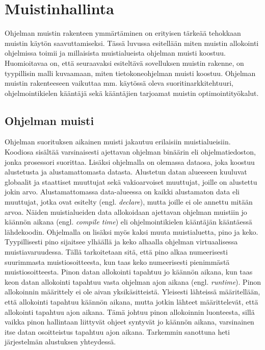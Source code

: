 \chapter{Muistinhallinta} \label{Toinen luku}

Ohjelman muistin rakenteen ymmärtäminen on erityisen tärkeää tehokkaan muistin käytön saavuttamiseksi. Tässä luvussa esitellään miten muistin allokointi ohjelmissa toimii ja millaisista muistialueista ohjelman muisti koostuu. Huomioitavaa on, että seuraavaksi esiteltävä sovelluksen muistin rakenne, on tyypillisin malli kuvaamaan, miten tietokoneohjelman muisti koostuu. Ohjelman muistin rakenteeseen vaikuttaa mm. käytössä oleva suoritinarkkitehtuuri, ohjelmointikielen kääntäjä sekä kääntäjien tarjoamat muistin optimointityökalut.

\section{Ohjelman muisti}

Ohjelman suorituksen aikainen muisti jakautuu erilaisiin muistialueisiin. Koodiosa sisältää varsinaisesti ajettavan ohjelman binäärin eli ohjelmatiedoston, jonka prosessori suorittaa. Lisäksi ohjelmalla on olemassa dataosa, joka koostuu alustetusta ja alustamattomasta datasta. Alustetun datan alueeseen kuuluvat globaalit ja staattiset muuttujat sekä vakioarvoiset muuttujat, joille on alustettu jokin arvo. Alustamattomassa data-alueessa on kaikki alustamaton data eli muuttujat, jotka ovat esitelty (engl. \textit{declare}), mutta joille ei ole annettu mitään arvoa. Näiden muistialueiden data allokoidaan ajettavan ohjelman muistiin jo käännön aikana (engl. \textit{compile time}) eli ohjelmointikielen kääntäjän kääntäessä lähdekoodin. Ohjelmalla on lisäksi myös kaksi muuta muistialuetta, pino ja keko. Tyypillisesti pino sijaitsee ylhäällä ja keko alhaalla ohjelman virtuaalisessa muistiavaruudessa.\cite{mmic2010} Tällä tarkoitetaan sitä, että pino alkaa numeerisesti suurimmasta muistiosoitteesta, kun taas keko numeerisesti pienimmästä muistiosoitteesta. Pinon datan allokointi tapahtuu jo käännön aikana, kun taas keon datan allokointi tapahtuu vasta ohjelman ajon aikana (engl. \textit{runtime})\cite{ddm2015book}. Pinon allokoinnin määrittely ei ole aivan yksikäsitteistä. Yleisesti lähteissä määritellään, että allokointi tapahtuu käännön aikana, mutta jotkin lähteet määrittelevät, että allokointi tapahtuu ajon aikana. Tämä johtuu pinon allokoinnin luonteesta, sillä vaikka pinon hallintaan liittyvät ohjeet syntyvät jo käännön aikana, varsinainen itse datan osoitteistus tapahtuu ajon aikana. Tarkemmin sanottuna heti järjestelmän alustuksen yhteydessä.

